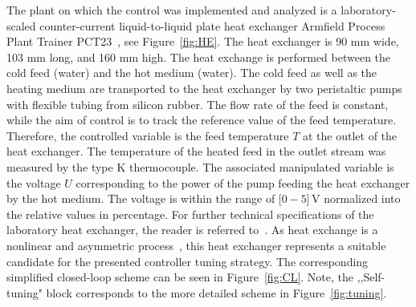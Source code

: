 \documentclass[preprint,12pt]{elsarticle}
\begin{document}
The plant on which the control was implemented and analyzed is a laboratory-scaled counter-current liquid-to-liquid plate heat exchanger Armfield Process Plant Trainer PCT23~\cite{pct23}, see Figure~\ref{fig:HE}. The heat exchanger is 90 mm wide, 103 mm long, and 160 mm high. The heat exchange is performed between the cold feed (water) and the hot medium (water). The cold feed as well as the heating medium are transported to the heat exchanger by two peristaltic pumps with flexible tubing from silicon rubber. The flow rate of the feed is constant, while the aim of control is to track the reference value of the feed temperature. Therefore, the controlled variable is the feed temperature $T$ at the outlet of the heat exchanger. The temperature of the heated feed in the outlet stream was measured by the type K thermocouple. The associated manipulated variable is the voltage $U$ corresponding to the power of the pump feeding the heat exchanger by the hot medium. The voltage is within the range of [$0-5$]\,V normalized into the relative values in percentage. For further technical specifications of the laboratory heat exchanger, the reader is referred to~\cite{pct23}. As heat exchange is a nonlinear and asymmetric process~\cite{Liptak}, this heat exchanger represents a suitable candidate for the presented controller tuning strategy. The corresponding simplified closed-loop scheme can be seen in Figure~\ref{fig:CL}. Note, the ,,Self-tuning" block corresponds to the more detailed scheme in Figure~\ref{fig:tuning}.  
\end{document}
